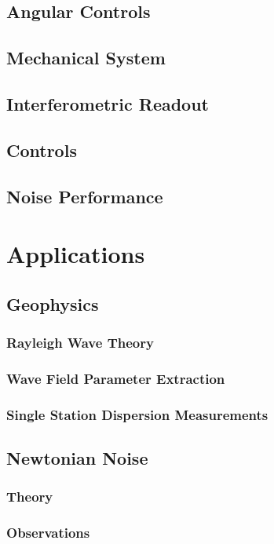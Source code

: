 \documentclass[12pt]{article}
\begin{document}
\subsection{Angular Controls}
\subsection{Mechanical System}
\subsection{Interferometric Readout}
\subsection{Controls}
\subsection{Noise Performance}

\section{Applications}
\subsection{Geophysics}
\subsubsection{Rayleigh Wave Theory}
\subsubsection{Wave Field Parameter Extraction}
\subsubsection{Single Station Dispersion Measurements}
\subsection{Newtonian Noise}
\subsubsection{Theory}
\subsubsection{Observations}



\end{document}
